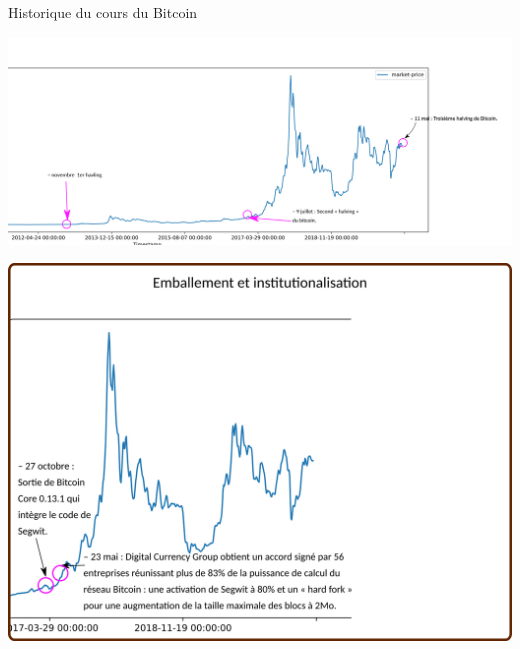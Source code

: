 \documentclass[presentation]{beamer}
\begin{document}
\begin{frame}[label={sec:org6ff9387}]{Historique du cours du Bitcoin}
\begin{block}{}
\begin{center}
\includegraphics[width=1.05\textwidth]{./Pictures/Timeline/62emballement_halvings.png}
\end{center}
\end{block}

\begin{block}{}
\begin{center}
\includegraphics[width=.95\textwidth]{./Pictures/Timeline/70emballement_segwit.png}
\end{center}
\end{block}


\end{frame}
\end{document}
